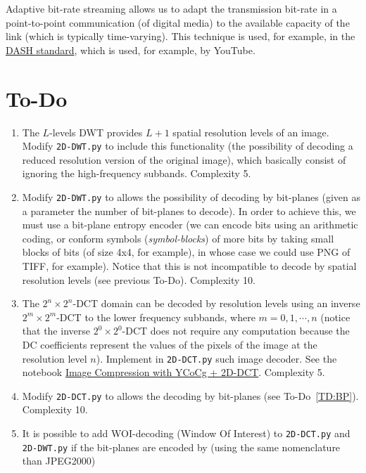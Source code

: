 Adaptive bit-rate streaming allows us to adapt the transmission bit-rate
in a point-to-point communication (of digital media) to the available
capacity of the link (which is typically time-varying). This
technique is used, for example, in the
\href{https://en.wikipedia.org/wiki/Dynamic_Adaptive_Streaming_over_HTTP}{DASH
  standard}, which is used, for example, by YouTube.


\section{To-Do}
\begin{enumerate}
\item The $L$-levels DWT provides $L+1$ spatial resolution levels of
  an image. Modify \texttt{2D-DWT.py} to include this functionality
  (the possibility of decoding a reduced resolution version of the
  original image), which basically consist of ignoring the
  high-frequency subbands. Complexity 5.
\item \label{TD:BP} Modify \texttt{2D-DWT.py} to allows the
  possibility of decoding by bit-planes (given as a parameter the
  number of bit-planes to decode). In order to achieve this, we must
  use a bit-plane entropy encoder (we can encode bits using an
  arithmetic coding, or conform symbols (\emph{symbol-blocks}) of more
  bits by taking small blocks of bits (of size 4x4, for example), in
  whose case we could use PNG of TIFF, for example). Notice that this is not
  incompatible to decode by spatial resolution levels (see previous
  To-Do). Complexity 10.
\item The $2^n\times 2^n$-DCT domain can be decoded by resolution
  levels using an inverse $2^m\times 2^m$-DCT to the lower frequency
  subbands, where $m=0,1,\cdots,n$ (notice that the inverse
  $2^0\times 2^0$-DCT does not require any computation because the DC
  coefficients represent the values of the pixels of the image at the
  resolution level $n$). Implement in \texttt{2D-DCT.py} such image
  decoder. See the notebook
  \href{https://github.com/vicente-gonzalez-ruiz/DCT2D/blob/master/src/DCT2D/YCoCg_2D_DCT_SQ.ipynb}{Image
    Compression with YCoCg + 2D-DCT}. Complexity 5.
\item Modify \texttt{2D-DCT.py} to allows the decoding by bit-planes
  (see To-Do~\ref{TD:BP}). Complexity 10.
\item It is possible to add WOI-decoding (Window Of Interest) to
  \texttt{2D-DCT.py} and \texttt{2D-DWT.py} if the bit-planes are
  encoded by (using the same nomenclature than JPEG2000)

\end{enumerate}
